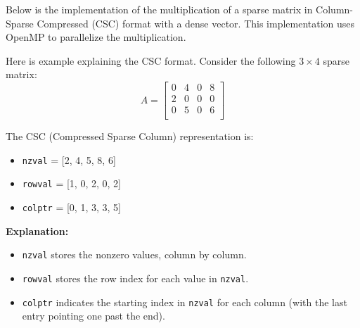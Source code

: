 \question{}

Below is the implementation of the multiplication of a sparse matrix in Column-Sparse Compressed (CSC) format with a dense vector.
This implementation uses OpenMP to parallelize the multiplication.

Here is example explaining the CSC format. Consider the following $3 \times 4$ sparse matrix:
\[
A = \begin{bmatrix}
0 & 4 & 0 & 8 \\
2 & 0 & 0 & 0 \\
0 & 5 & 0 & 6 \\
\end{bmatrix}
\]

The CSC (Compressed Sparse Column) representation is:
\begin{itemize}
    \item \texttt{nzval} = [2, 4, 5, 8, 6]
    \item \texttt{rowval} = [1, 0, 2, 0, 2]
    \item \texttt{colptr} = [0, 1, 3, 3, 5]
\end{itemize}

\textbf{Explanation:}
\begin{itemize}
    \item \texttt{nzval} stores the nonzero values, column by column.
    \item \texttt{rowval} stores the row index for each value in \texttt{nzval}.
    \item \texttt{colptr} indicates the starting index in \texttt{nzval} for each column (with the last entry pointing one past the end).
\end{itemize}




